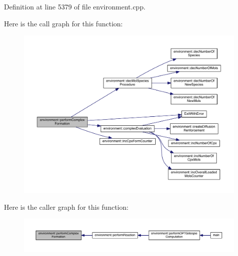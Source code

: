 Definition at line 5379 of file environment.\-cpp.



Here is the call graph for this function\-:\nopagebreak
\begin{figure}[H]
\begin{center}
\leavevmode
\includegraphics[width=350pt]{a00014_aaf4f4f6be28edb182d2a2516c9394f9b_cgraph}
\end{center}
\end{figure}




Here is the caller graph for this function\-:\nopagebreak
\begin{figure}[H]
\begin{center}
\leavevmode
\includegraphics[width=350pt]{a00014_aaf4f4f6be28edb182d2a2516c9394f9b_icgraph}
\end{center}
\end{figure}


